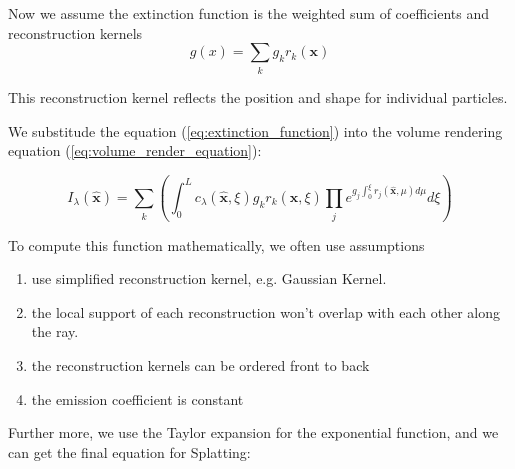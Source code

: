 



Now we assume the extinction function is the weighted 
sum of coefficients and reconstruction kernels
\begin{equation}
g(x)=\sum\limits_{k}\limits^{} g_kr_k(\mathbf{x})
\label{eq:extinction_function}
\end{equation}


This reconstruction kernel reflects the position and shape for individual particles.

We substitude the equation (\ref{eq:extinction_function}) into the volume rendering equation (\ref{eq:volume_render_equation}):

$$I_{\lambda}(\hat{\mathbf{x}})=
\sum\limits_{k}\limits^{} 
(
    \int_0^L c_\lambda(\hat{\mathbf{x}},\xi)g_kr_k(\hat{\mathbf{x}},\xi)
    \prod\limits_{j }\limits^{} e^{
        g_j \int_0^\xi r_j(\hat{\mathbf{x}},\mu)d\mu
    } d\xi
)$$

To compute this function mathematically, we often use assumptions

\begin{enumerate}
    \item use simplified reconstruction kernel, e.g. Gaussian Kernel.
    \item the local support of each reconstruction won't overlap with each other along the ray.
    \item the reconstruction kernels can be ordered front to back
    \item the emission coefficient is constant 
\end{enumerate}

Further more, we use the Taylor expansion for the exponential function, and we can get the final equation for Splatting:

